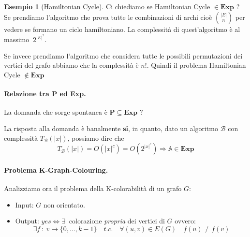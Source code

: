 \documentclass[a4paper]{article}
\theoremstyle{definition}
\newtheorem{esempio}{Esempio}[subsection]
\newcommand{\Exp}{\mathbf{Exp}}
\newcommand{\p}{\mathbf{P}}
\newcommand{\prob}[1]{\mathbb{#1}}
\newcommand{\alg}[1]{\mathcal{#1}}
\newcommand{\compl}[2]{T_\alg{#1}( \vert #2 \vert)}
\begin{document}
			\begin{esempio}[Hamiltonian Cycle]
				Ci chiediamo se Hamiltonian Cycle $ \in \Exp$ ? Se prendiamo l'algoritmo che prova tutte le combinazioni di archi cioè $ \binom{\vert E \vert}{n} $ per vedere se formano un ciclo hamiltoniano. La complessità di quest'algoritmo è al massimo $\ 2^{\vert E \vert^2} $. 
				
				Se invece prendiamo l'algoritmo che considera tutte le possibili permutazioni dei vertici del grafo abbiamo che la complessità è $ n! $. Quindi il problema Hamiltonian Cycle $ \notin \Exp $
			\end{esempio}
			
			\paragraph{Relazione tra P ed Exp.} La domanda che sorge spontanea è $ \p \subseteq \Exp $ ?
			
			La risposta alla domanda è banalmente \textbf{si}, in quanto, dato un algoritmo $ \alg{B} $ con complessità $\compl{B}{x}$, possiamo dire che 
			\[ 
				\compl{B}{x} = O(\vert x \vert ^ c) = O(2^{\vert x \vert ^ c}) \Rightarrow \prob{A} \in \Exp 
			\]
			
			\paragraph{Problema K-Graph-Colouring.} Analizziamo ora il problema della K-colorabilità di un grafo $ G $:
			\begin{itemize}
				\item Input: $ G $ non orientato.
				\item Output: $ yes \Leftrightarrow \exists\ $ colorazione \textit{propria} dei vertici di $ G $ ovvero:
				\[
					\exists f\ \colon\ v \mapsto \{0,\dots, k-1 \}\quad t.c.\quad \forall (u,v)\in E(G)\quad f(u) \neq f(v)
				\]
			\end{itemize}
			
\end{document}
